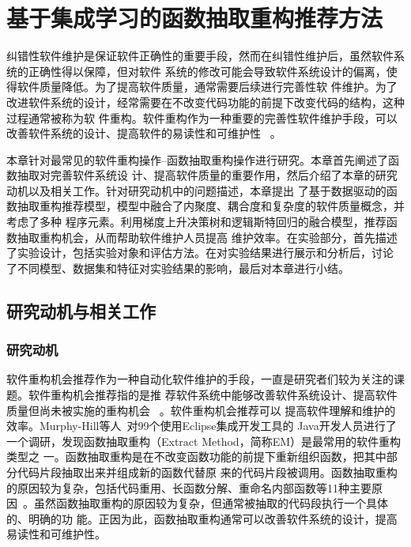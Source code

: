 

\chapter{基于集成学习的函数抽取重构推荐方法} 
纠错性软件维护是保证软件正确性的重要手段，然而在纠错性维护后，虽然软件系统的正确性得以保障，但对软件
系统的修改可能会导致软件系统设计的偏离，使得软件质量降低。为了提高软件质量，通常需要后续进行完善性软
件维护。为了改进软件系统的设计，经常需要在不改变代码功能的前提下改变代码的结构，这种过程通常被称为软
件重构。软件重构作为一种重要的完善性软件维护手段，可以改善软件系统的设计、提高软件的易读性和可维护性
~\cite{fowler,mens:TSE04}。

本章针对最常见的软件重构操作--函数抽取重构操作进行研究。本章首先阐述了函数抽取对完善软件系统设
计、提高软件质量的重要作用，然后介绍了本章的研究动机以及相关工作。针对研究动机中的问题描述，本章提出
了基于数据驱动的函数抽取重构推荐模型，模型中融合了内聚度、耦合度和复杂度的软件质量概念，并考虑了多种
程序元素。利用梯度上升决策树和逻辑斯特回归的融合模型，推荐函数抽取重构机会，从而帮助软件维护人员提高
维护效率。在实验部分，首先描述了实验设计，包括实验对象和评估方法。在对实验结果进行展示和分析后，讨论
了不同模型、数据集和特征对实验结果的影响，最后对本章进行小结。

\section{研究动机与相关工作}
\subsection{研究动机}
软件重构机会推荐作为一种自动化软件维护的手段，一直是研究者们较为关注的课题。软件重构机会推荐指的是推
荐软件系统中能够改善软件系统设计、提高软件质量但尚未被实施的重构机会
~\cite{fokaefs:icse11,higo:JSME,Liu:IEEE-TSE:12,Tourwe:CSMR03,Tsantalis:2011}。软件重构机会推荐可以
提高软件理解和维护的效率。Murphy-Hill等人~\cite{Murphy-Hill:ICSE09}对99个使用Eclipse集成开发工具的
Java开发人员进行了一个调研，发现函数抽取重构（Extract Method，简称EM）是最常用的软件重构类型之
一。函数抽取重构是在不改变函数功能的前提下重新组织函数，把其中部分代码片段抽取出来并组成新的函数代替原
来的代码片段被调用。函数抽取重构的原因较为复杂，包括代码重用、长函数分解、重命名内部函数等11种主要原
因~\cite{silva2016we}。虽然函数抽取重构的原因较为复杂，但通常被抽取的代码段执行一个具体的、明确的功
能。正因为此，函数抽取重构通常可以改善软件系统的设计，提高易读性和可维护性。


